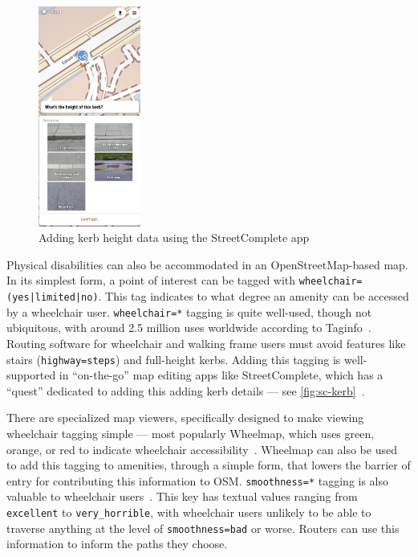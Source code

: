 \documentclass{final_report}
\begin{document}

\begin{figure}[ht]
    \centering
    \includegraphics[width=0.3\textwidth]{images/street-complete-kerb.jpg}
    \caption{Adding kerb height data using the StreetComplete app}\label{fig:sc-kerb}
\end{figure}

Physical disabilities can also be accommodated in an OpenStreetMap-based map. In its simplest form, a point of interest can be tagged with \texttt{wheelchair=(yes|limited|no)}. This tag indicates to what degree an amenity can be accessed by a wheelchair user. \texttt{wheelchair=*} tagging is quite well-used, though not ubiquitous, with around 2.5 million uses worldwide according to Taginfo~\cite{taginfo-wheelchair}. Routing software for wheelchair and walking frame users must avoid features like stairs (\texttt{highway=steps}) and full-height kerbs. Adding this tagging is well-supported in ``on-the-go'' map editing apps like StreetComplete, which has a ``quest'' dedicated to adding this adding kerb details --- see \autoref{fig:sc-kerb}~\cite{streetcomplete}. 

There are specialized map viewers, specifically designed to make viewing wheelchair tagging simple --- most popularly Wheelmap, which uses green, orange, or red to indicate wheelchair accessibility~\cite{wheelmap}. Wheelmap can also be used to add this tagging to amenities, through a simple form, that lowers the barrier of entry for contributing this information to OSM\@. \texttt{smoothness=*} tagging is also valuable to wheelchair users~\cite{osm-wiki-smoothness}. This key has textual values ranging from \texttt{excellent} to \texttt{very\_horrible}, with wheelchair users unlikely to be able to traverse anything at the level of \texttt{smoothness=bad} or worse. Routers can use this information to inform the paths they choose.
\end{document}
